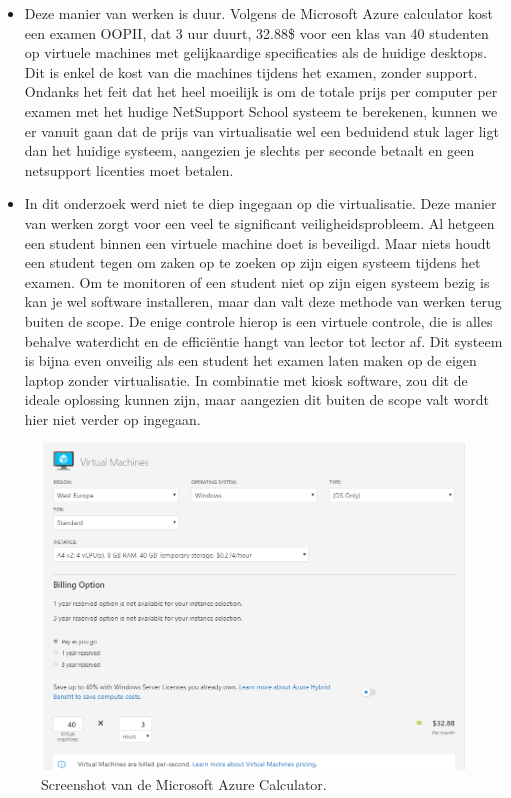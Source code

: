 \begin{itemize}
	\item Deze manier van werken is duur. Volgens de Microsoft Azure calculator kost een examen OOPII, dat 3 uur duurt, 32.88\$ voor een klas van 40 studenten op virtuele machines met gelijkaardige specificaties als de huidige desktops. Dit is enkel de kost van die machines tijdens het examen, zonder support. Ondanks het feit dat het heel moeilijk is om de totale prijs per computer per examen met het hudige NetSupport School systeem te berekenen, kunnen we er vanuit gaan dat de prijs van virtualisatie wel een beduidend stuk lager ligt dan het huidige systeem, aangezien je slechts per seconde betaalt en geen netsupport licenties moet betalen. 
	
	\item In dit onderzoek werd niet te diep ingegaan op die virtualisatie. Deze manier van werken zorgt voor een veel te significant veiligheidsprobleem. Al hetgeen een student binnen een virtuele machine doet is beveiligd. Maar niets houdt een student tegen om zaken op te zoeken op zijn eigen systeem tijdens het examen. Om te monitoren of een student niet op zijn eigen systeem bezig is kan je wel software installeren, maar dan valt deze methode van werken terug buiten de scope. De enige controle hierop is een virtuele controle, die is alles behalve waterdicht en de effici\"entie hangt van lector tot lector af. Dit systeem is bijna even onveilig als een student het examen laten maken op de eigen laptop zonder virtualisatie. In combinatie met kiosk software, zou dit de ideale oplossing kunnen zijn, maar aangezien dit buiten de scope valt wordt hier niet verder op ingegaan.
	
\end{itemize}
	
	\begin{figure}
	\includegraphics[width=\linewidth]{img/AzCalc.PNG}
	\caption{Screenshot van de Microsoft Azure Calculator.}
	\label{fig:Calculator1}
\end{figure}

